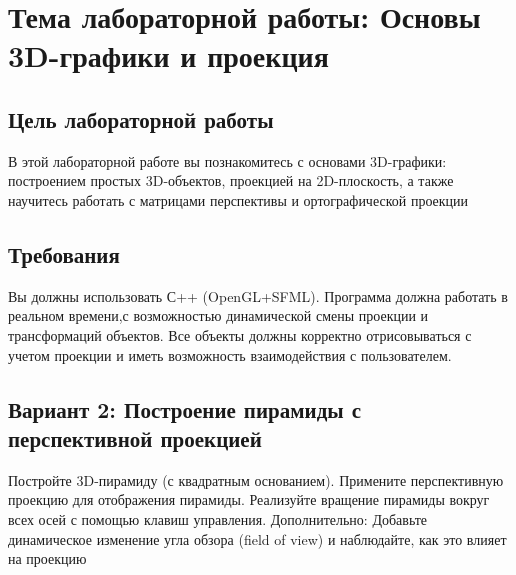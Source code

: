 \section*{Тема лабораторной работы: Основы 3D-графики и проекция}

\subsection{Цель лабораторной работы}

В этой лабораторной работе вы познакомитесь с основами 3D-графики: построением
простых 3D-объектов, проекцией на 2D-плоскость, а также научитесь работать с матрицами
перспективы и ортографической проекции

\subsection{Требования}

Вы должны использовать С++ (OpenGL+SFML).
Программа должна работать в реальном времени,с возможностью динамической смены
проекции и трансформаций объектов.
Все объекты должны корректно отрисовываться с учетом проекции и иметь возможность
взаимодействия с пользователем.

\subsection{Вариант 2: Построение пирамиды с перспективной проекцией}

Постройте 3D-пирамиду (с квадратным основанием).
 Примените перспективную проекцию для отображения пирамиды.
 Реализуйте вращение пирамиды вокруг всех осей с помощью клавиш управления.
 Дополнительно: Добавьте динамическое изменение угла обзора (field of view) и наблюдайте,
 как это влияет на проекцию
 \pagebreak